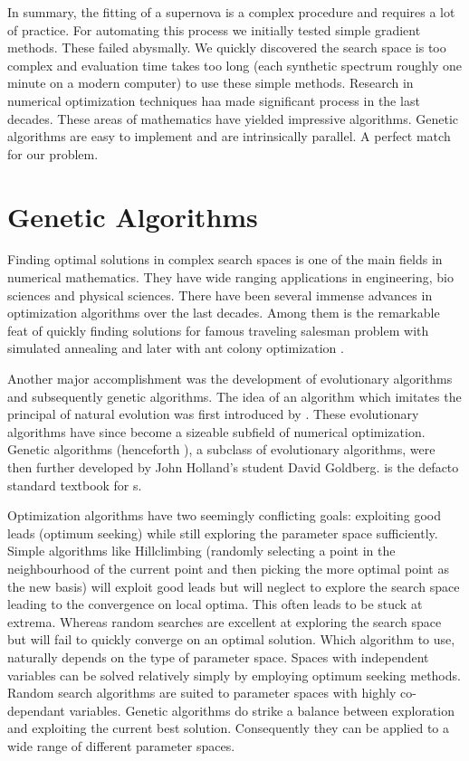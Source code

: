 In summary, the fitting of a supernova is a complex procedure and requires a lot of practice. For automating this process we initially tested simple gradient methods. These failed abysmally. We quickly discovered the search space is too complex and evaluation time takes too long (each synthetic spectrum roughly one minute on a modern computer) to use these simple methods. Research in numerical optimization techniques haa made significant process in the last decades. These areas of mathematics have yielded impressive algorithms. Genetic algorithms are easy to implement and are intrinsically parallel. A perfect match for our problem.

 
\section{Genetic Algorithms}
\label{sec:intro_ga}

Finding optimal solutions in complex search spaces is one of the main fields in numerical mathematics.  They have wide ranging applications in engineering, bio sciences and physical sciences. There have been several immense advances in optimization algorithms over the last decades.
Among them is the  remarkable feat of quickly finding solutions for famous traveling salesman problem with simulated annealing \citep{Kirkpatrick13051983} and later with ant colony optimization \citep{Dorigo97antcolonies}.

Another major accomplishment was the development of evolutionary algorithms and subsequently genetic algorithms. The idea of an algorithm which imitates the principal of natural evolution was first introduced by \cite{Holland:1962:OLT:321127.321128}. These evolutionary algorithms have since become a sizeable subfield of numerical optimization. Genetic algorithms (henceforth \ga), a subclass of evolutionary algorithms, were then further developed by John Holland's student David Goldberg.  \citep{citeulike:125978} is the defacto standard textbook for \ga s.

Optimization algorithms have two seemingly conflicting goals: exploiting good leads (optimum seeking) while still exploring the parameter space sufficiently. Simple algorithms like Hillclimbing (randomly selecting a point in the neighbourhood of the current point and then picking the more optimal point as the new basis) will exploit good leads but will neglect to explore the search space leading to the convergence on local optima. This often leads to be stuck at extrema. Whereas random searches are excellent at exploring the search space but will fail to quickly converge on an optimal solution. Which algorithm to use, naturally depends on the type of parameter space. Spaces with independent variables can be solved relatively simply by employing optimum seeking methods. Random search algorithms are suited to parameter spaces with highly co-dependant variables. Genetic algorithms do strike a balance between exploration and exploiting the current best solution. Consequently they can be applied to a wide range of different parameter spaces.

